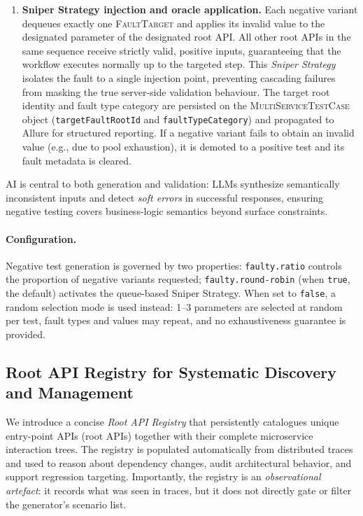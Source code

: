 \documentclass[conference]{IEEEtran}
\begin{document}
\begin{enumerate}[leftmargin=*]
  \item \textbf{Sniper Strategy injection and oracle application.} Each negative variant dequeues exactly one \textsc{FaultTarget} and applies its invalid value to the designated parameter of the designated root API. All other root APIs in the same sequence receive strictly valid, positive inputs, guaranteeing that the workflow executes normally up to the targeted step. This \emph{Sniper Strategy} isolates the fault to a single injection point, preventing cascading failures from masking the true server-side validation behaviour. The target root identity and fault type category are persisted on the \textsc{MultiServiceTestCase} object (\texttt{targetFaultRootId} and \texttt{faultTypeCategory}) and propagated to Allure for structured reporting. If a negative variant fails to obtain an invalid value (e.g., due to pool exhaustion), it is demoted to a positive test and its fault metadata is cleared.
\end{enumerate}

AI is central to both generation and validation: LLMs synthesize semantically inconsistent inputs and detect \emph{soft errors} in successful responses, ensuring negative testing covers business-logic semantics beyond surface constraints.

\paragraph{Configuration.}
Negative test generation is governed by two properties: \texttt{faulty.ratio} controls the proportion of negative variants requested; \texttt{faulty.round-robin} (when \texttt{true}, the default) activates the queue-based Sniper Strategy. When set to \texttt{false}, a random selection mode is used instead: 1--3 parameters are selected at random per test, fault types and values may repeat, and no exhaustiveness guarantee is provided.

\subsection{Root API Registry for Systematic Discovery and Management}\label{ssec:registry}

We introduce a concise \emph{Root API Registry} that persistently catalogues unique entry-point APIs (root APIs) together with their complete microservice interaction trees. The registry is populated automatically from distributed traces and used to reason about dependency changes, audit architectural behavior, and support regression targeting. Importantly, the registry is an \emph{observational artefact}: it records what was seen in traces, but it does not directly gate or filter the generator's scenario list.
\end{document}
